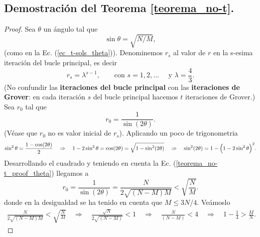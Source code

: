 \documentclass[a4paper,11pt]{article} %
\numberwithin{equation}{section}
\def\Lp{\Bigl(}
\def\Rp{\Bigr)}
\def\rqa{\quad \Rightarrow \quad}
\begin{document}
\subsection{Demostración del Teorema \ref{teorema_no-t}.}

\begin{proof}
Sea $\theta$ un ángulo tal que 
\begin{equation} \label{teorema_no-t_proof_theta}
\sin \theta = \sqrt{N/M},
\end{equation}
(como en la Ec. (\ref{ec_t-sols_theta})). Denominemos $r_s$ al valor de $r$ en la s-esima iteración del bucle principal, es decir
\begin{equation} \label{teorema_no-t_proof_r-s}
r_s = \lambda^{s-1}, \qquad \text{con } s = 1,2,\dots \quad \text{ y } \lambda = \frac{4}{3}.
\end{equation} 
(No confundir las \textbf{iteraciones del bucle principal} con las \textbf{iteraciones de Grover}: en cada iteración $s$ del bucle principal hacemos $t$ iteraciones de Grover.) Sea $r_0$ tal que
\begin{equation}  
r_0 = \frac{1}{\sin (2 \theta)}.
\end{equation}
(Véase que $r_0$ no es valor inicial de $r_s$). Aplicando un poco de trigonometria
\begin{equation*}
\sin^2 \theta =  \frac{1-\cos (2\theta)}{2} 
\rqa 1 - 2 \sin^2 \theta = \cos (2 \theta) = \sqrt{1 - \sin^2 (2 \theta)} 
\rqa \sin^2 (2 \theta) = 1 - \Lp 1 - 2 \sin^2 \theta \Rp^2.
\end{equation*}
Desarrollando el cuadrado y teniendo en cuenta la Ec. (\ref{teorema_no-t_proof_theta}) llegamos a
\begin{equation} \label{teorema_no-t_proof_alpha}
r_0 = \frac{1}{\sin (2 \theta)} = \frac{N}{2 \sqrt{(N-M)M}} < \sqrt{\frac{N}{M}}.
\end{equation}
donde en la desigualdad se ha tenido en cuenta que $M \leq 3N/4$. Veámoslo
\begin{align*}
\frac{N}{2 \sqrt{(N-M)M}} < \sqrt{\frac{N}{M}} 
\rqa  \frac{\sqrt{N}}{2 \sqrt{(N-M)}} < 1 
\rqa \frac{N}{(N-M)} < 4 
\rqa  1 - \frac{1}{4} > \frac{M}{N}.
\end{align*}


\end{proof}
\end{document}
